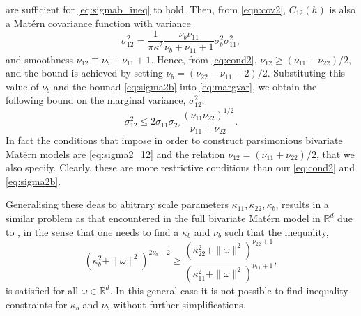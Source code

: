 \documentclass[lineno]{biometrika}
\newcommand{\red}{\textcolor{red}}%
\newcommand{\omegab} {\omega}
\newcommand{\h}{h}
\begin{document}
\noindent are sufficient for \eqref{eq:sigmab_ineq} to hold. Then, from \eqref{eqn:cov2}, $C_{12}(\h)$ is also a Mat{\'e}rn covariance function with variance 
\begin{equation}\label{eq:margvar}
\sigma^2_{12} = \frac{1}{\pi\kappa^{2}}\frac{\nu_b\nu_{11}}{\nu_b + \nu_{11} + 1}\sigma_b^2\sigma_{11}^2,
\end{equation}
 and smoothness $\nu_{12} \equiv \nu_b + \nu_{11} + 1$. Hence, from \eqref{eq:cond2}, $\nu_{12} \ge (\nu_{11} + \nu_{22})/2$, and the bound is achieved by setting $\nu_b = (\nu_{22} - \nu_{11} - 2) / 2$. Substituting this value of $\nu_b$ and the bounad \eqref{eq:sigma2b} into \eqref{eq:margvar}, we obtain the following bound on the marginal variance, $\sigma_{12}^2$:
 \begin{equation}\label{eq:sigma2_12}
 \sigma^2_{12} \le 2\sigma_{11}\sigma_{22}\frac{(\nu_{11}\nu_{22})^{1/2}}{\nu_{11} + \nu_{22}}.
 \end{equation}
 \noindent In fact the conditions that \citet{Gneitingetal2010} impose in order to construct parsimonious bivariate Mat{\'e}rn models are \eqref{eq:sigma2_12} and the relation $\nu_{12} = (\nu_{11} + \nu_{22})/2$, that we also specify. Clearly, these are more restrictive conditions than our \eqref{eq:cond2} and \eqref{eq:sigma2b}.
 
 Generalising these deas to abitrary scale parameters $\kappa_{11}, \kappa_{22}, \kappa_b$, results in a similar problem as that encountered in the full bivariate Mat{\'e}rn model in $\mathbb{R}^d$ due to \citet{Gneitingetal2010}, in the sense that one needs to find a $\kappa_b$ and $\nu_b$ such that the inequality,
 \begin{equation*}
 (\kappa_b^2 + \|\omegab\|^2)^{2\nu_b + 2} \ge \frac{(\kappa_{22}^2 + \|\omegab\|^2)^{\nu_{22} + 1}}{(\kappa_{11}^2 + \|\omegab\|^2)^{\nu_{11} + 1}},
 \end{equation*}
 \noindent is satisfied for all $\omegab \in \mathbb{R}^d$. In this general case it is not possible to find inequality constraints for $\kappa_b$ and $\nu_b$ without further simplifications.

\end{document}
